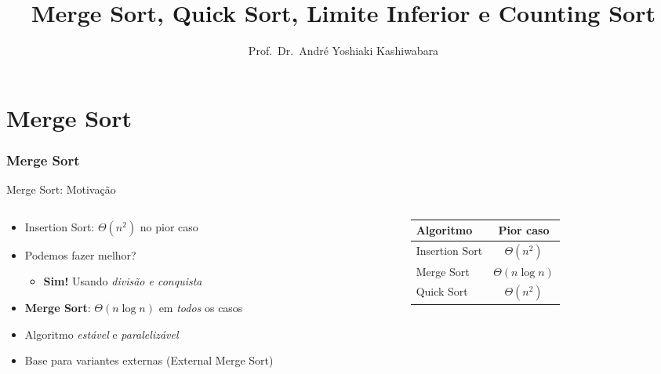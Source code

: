 \documentclass[aspectratio=169]{beamer}
\title{Merge Sort, Quick Sort, Limite Inferior e Counting Sort}
\author{Prof.\ Dr.\ André Yoshiaki Kashiwabara}
\institute{DCOMP --- Universidade Federal de Sergipe}
\date{}
\begin{document}
\begin{frame}
  \titlepage
\end{frame}

\part{Merge Sort}
\section{Merge Sort}

\begin{frame}{Merge Sort: Motivação}
  \begin{columns}[T]
    \begin{column}{0.54\textwidth}
      \begin{itemize}
        \item Insertion Sort: $\Theta(n^2)$ no pior caso\\[4pt]
        \item Podemos fazer melhor?
          \begin{itemize}
            \item \textbf{Sim!} Usando \emph{divisão e conquista}
          \end{itemize}
        \item \textbf{Merge Sort}: $\Theta(n \log n)$ em \emph{todos} os casos
        \item Algoritmo \emph{estável} e \emph{paralelizável}
        \item Base para variantes externas (External Merge Sort)
      \end{itemize}
    \end{column}
    \begin{column}{0.42\textwidth}
      \begin{center}
        \renewcommand{\arraystretch}{1.3}
        \begin{tabular}{lc}
          \hline
          \textbf{Algoritmo} & \textbf{Pior caso} \\
          \hline
          Insertion Sort & $\Theta(n^2)$ \\
          Merge Sort     & $\Theta(n \log n)$ \\
          Quick Sort     & $\Theta(n^2)$ \\
          \hline
        \end{tabular}
      \end{center}
    \end{column}
  \end{columns}
\end{frame}
\end{document}
